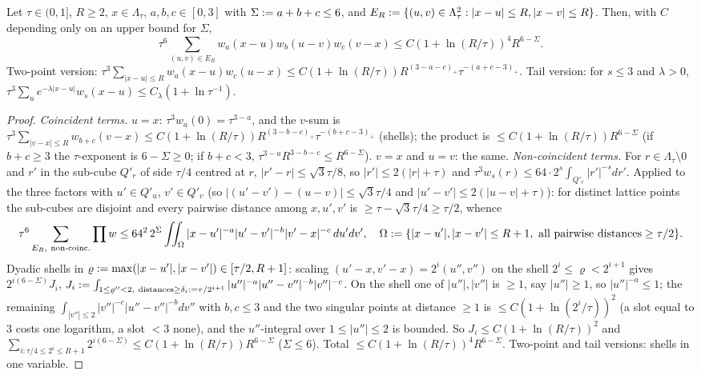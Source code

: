 \begin{lemma}\label{app:a04:lem:PC}
Let $\tau\in(0,1]$, $R\ge2$, $x\in\Lambda_\tau$, $a,b,c\in[0,3]$ with $\Sigma:= a+b+c\le6$, and $E_R:=\{(u,v)\in\Lambda_\tau^2:|x-u|\le R,|x-v|\le R\}$. Then, with $C$ depending only on an upper bound for $\Sigma$,
\begin{equation}\label{app:a04:eq:PC}
\tau^6\sum_{(u,v)\in E_R}w_a(x-u)w_b(u-v)w_c(v-x)\le C(1+\ln(R/\tau))^4R^{6-\Sigma}.
\end{equation}
Two-point version: $\tau^3\sum_{|x-u|\le R}w_a(x-u)w_c(u-x)\le C(1+\ln(R/\tau))R^{(3-a-c)_+}\tau^{-(a+c-3)_+}$. Tail version: for $s\le3$ and $\lambda>0$, $\tau^3\sum_ue^{-\lambda|x-u|}w_s(x-u)\le C_\lambda(1+\ln\tau^{-1})$.
\end{lemma}
\begin{proof}
\emph{Coincident terms.} $u=x$: $\tau^3w_a(0)=\tau^{3-a}$, and the $v$-sum is $\tau^3\sum_{|v-x|\le R}w_{b+c}(v-x)\le C(1+\ln(R/\tau))R^{(3-b-c)_+}\tau^{-(b+c-3)_+}$ (shells); the product is $\le C(1+\ln(R/\tau))R^{6-\Sigma}$ (if $b+c\ge3$ the $\tau$-exponent is $6-\Sigma\ge0$; if $b+c<3$, $\tau^{3-a}R^{3-b-c}\le R^{6-\Sigma}$). $v=x$ and $u=v$: the same. \emph{Non-coincident terms.} For $r\in\Lambda_\tau\setminus0$ and $r'$ in the sub-cube $Q'_r$ of side $\tau/4$ centred at $r$, $|r'-r|\le\sqrt3\tau/8$, so $|r'|\le2(|r|+\tau)$ and $\tau^3w_s(r)\le64\cdot2^s\int_{Q'_r}|r'|^{-s}dr'$. Applied to the three factors with $u'\in Q'_u$, $v'\in Q'_v$ (so $|(u'-v')-(u-v)|\le\sqrt3\tau/4$ and $|u'-v'|\le2(|u-v|+\tau)$): for distinct lattice points the sub-cubes are disjoint and every pairwise distance among $x,u',v'$ is $\ge\tau-\sqrt3\tau/4\ge\tau/2$, whence
\[
\tau^6\sum_{E_R,\ \text{non-coinc.}}\prod w\le64^2\,2^\Sigma\iint_\Omega|x-u'|^{-a}|u'-v'|^{-b}|v'-x|^{-c}\,du'dv',\quad\Omega\defeq\{|x-u'|,|x-v'|\le R+1,\ \text{all pairwise distances}\ge\tau/2\}.
\]
Dyadic shells in $\varrho:=\max(|x-u'|,|x-v'|)\in[\tau/2,R+1]$: scaling $(u'-x,v'-x)=2^i(u'',v'')$ on the shell $2^i\le\varrho<2^{i+1}$ gives $2^{i(6-\Sigma)}J_i$, $J_i\defeq\int_{1\le\varrho''<2,\ \text{distances}\ge\delta_i\defeq\tau/2^{i+1}}|u''|^{-a}|u''-v''|^{-b}|v''|^{-c}$. On the shell one of $|u''|,|v''|$ is $\ge1$, say $|u''|\ge1$, so $|u''|^{-a}\le1$; the remaining $\int_{|v''|\le2}|v''|^{-c}|u''-v''|^{-b}dv''$ with $b,c\le3$ and the two singular points at distance $\ge1$ is $\le C(1+\ln(2^i/\tau))^2$ (a slot equal to $3$ costs one logarithm, a slot $<3$ none), and the $u''$-integral over $1\le|u''|\le2$ is bounded. So $J_i\le C(1+\ln(R/\tau))^2$ and $\sum_{i:\tau/4\le2^i\le R+1}2^{i(6-\Sigma)}\le C(1+\ln(R/\tau))R^{6-\Sigma}$ ($\Sigma\le6$). Total $\le C(1+\ln(R/\tau))^4R^{6-\Sigma}$. Two-point and tail versions: shells in one variable.
\end{proof}

